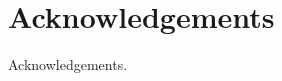 \pagestyle{empty}

\title{\LARGE{\thesistitle} \\[3cm]}

\author{\Large{\authorname} \\ \Large{\collegename} \\[3cm]}

\date{\DPhiltext \\[1cm] \DPhildate}

\maketitle

\cleardoublepage

\cleardoublepage

\begin{abstract}
\abstext
\end{abstract}

%
%

\cleardoublepage

\chapter*{Acknowledgements}

Acknowledgements.

\cleardoublepage

\tableofcontents

